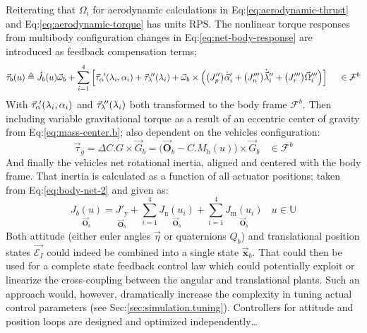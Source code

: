 Reiterating that $\Omega_i$ for aerodynamic calculations in Eq:\ref{eq:aerodynamic-thrust} and Eq:\ref{eq:aerodynamic-torque} has units $\text{RPS}$. The nonlinear torque responses from multibody configuration changes in Eq:\ref{eq:net-body-response} are introduced as feedback compensation terms;
\begin{equation}\label{eq:actuator-torque}
\vec{\tau}_b(u)\triangleq\dot{J}_b(u)\vec{\omega}_b+\sum_{i=1}^{4}\Big[\vec{\tau}_\alpha\hspace{-1pt}'(\lambda_i,\alpha_i)+\vec{\tau}_\lambda\hspace{-2pt}''(\lambda_i)+\vec{\omega}_b\times\Big(\big(J_p''\big)\dot{\vec{\alpha}}_i'+\big(J_n'''\big)\dot{\vec{\lambda}}_i''+\big(J_r'''\big)\vec{\Omega}_i'''\Big)\Big]~~~~\in\mathcal{F}^b
\end{equation}
With $\vec{\tau}_\alpha\hspace{-2pt}'(\lambda_i,\alpha_i)$ and $\vec{\tau}_\lambda\hspace{-2pt}''(\lambda_i)$ both transformed to the body frame $\mathcal{F}^b$. Then including variable gravitational torque as a result of an eccentric center of gravity from Eq:\ref{eq:mass-center.b}; also dependent on the vehicles configuration:
\begin{equation}\label{eq:consolidated-grav-torque}
\vec{\tau}_g=\Delta C.G \times\vec{G}_b=\big(\vec{\mathbf{O}}_b-C.M_\text{b}(u)\big)\times\vec{G}_b~~~~\in\mathcal{F}^b
\end{equation}
And finally the vehicles net rotational inertia, aligned and centered with the body frame. That inertia is calculated as a function of all actuator positions; taken from Eq:\ref{eq:body-net-2} and given as:
\begin{equation}
\underset{\vec{\mathbf{O}}_b}{J_b(u)}=\underset{\vec{\mathbf{O}}_b}{J'_\text{y}}+\sum_{i=1}^{4} \underset{\vec{\mathbf{O}}_b}{J_\text{n}(u_i)}+\sum_{i=1}^{4} \underset{\vec{\mathbf{O}}_b}{J_\text{m}(u_i)}~~~~u\in\mathbb{U}
\end{equation}
Both attitude (either euler angles $\vec{\eta}$ or quaternions $Q_b$) and translational position states $\vec{\mathcal{E}_I}$ could indeed be combined into a single state $\vec{\mathbf{x}}_b$. That could then be used for a complete state feedback control law which could potentially exploit or linearize the cross-coupling between the angular and translational plants. Such an approach would, however, dramatically increase the complexity in tuning actual control parameters (see Sec:\ref{sec:simulation.tuning}). Controllers for attitude and position loops are designed and optimized independently\ldots